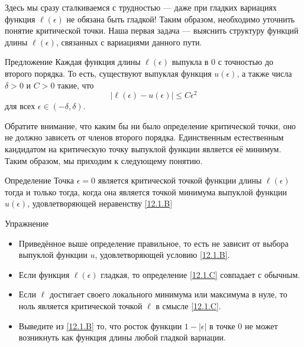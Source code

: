 Здесь мы сразу сталкиваемся с трудностью — даже при гладких вариациях функция $\ell(\epsilon)$ не обязана быть гладкой!
Таким образом, необходимо уточнить понятие критической точки.
Наша первая задача — выяснить структуру функций длины
$\ell(\epsilon)$, связанных с вариациями данного пути. 

\begin{ex}{Предложение}\label{12.1.B}
Каждая функция длины $\ell(\epsilon)$ выпукла в $0$ с точностью до
второго порядка. 
То есть, существуют выпуклая функция $u(\epsilon)$, а также числа
$\delta > 0$ и $C > 0$ такие, что  
\[|\ell(\epsilon) - u(\epsilon)| \le C\epsilon^2\]
для всех $\epsilon \in (-\delta, \delta)$.
\end{ex}

Обратите внимание, что каким бы ни было определение критической точки,
оно не должно зависеть от членов второго порядка. 
Единственным естественным кандидатом на критическую точку выпуклой
функции является её минимум. 
Таким образом, мы приходим к следующему понятию.

\begin{ex}{Определение}\label{12.1.C}
Точка $\epsilon = 0$ является критической точкой функции длины $\ell(\epsilon)$ тогда и только тогда, когда она является точкой минимума выпуклой функции $u(\epsilon)$, удовлетворяющей неравенству \ref{12.1.B}
\end{ex}

\begin{ex}{Упражнение}\label{12.1.D}
\begin{itemize}

\item Приведённое выше определение правильное, то есть не зависит от выбора выпуклой функции $u$, удовлетворяющей условию \ref{12.1.B}.


\item Если функция $\ell(\epsilon)$ гладкая, то определение \ref{12.1.C} совпадает с обычным.


\item Если $\ell$ достигает своего локального минимума или максимума в
  нуле, то ноль является критической точкой $\ell$ в смысле
  \ref{12.1.C}. 


\item Выведите из \ref{12.1.B} то, что росток функции $1 - |\epsilon|$
  в точке $0$ не может возникнуть как функция длины любой гладкой
  вариации.
\end{itemize}
\end{ex}

